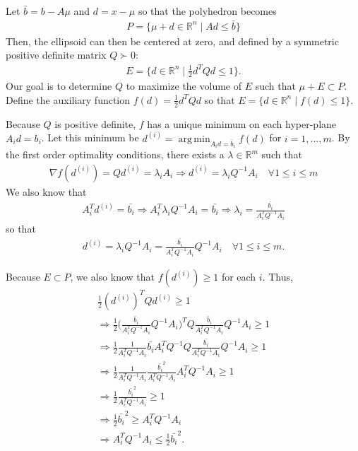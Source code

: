 \documentclass{article}
\theoremstyle{case}
\DeclareMathOperator*{\argmin}{arg\,min}
\newcommand{\Rn}{\mathbb R^n}
\newcommand{\Rm}{\mathbb R^m}
\newcommand{\gradf}{\nabla f}
\begin{document}
Let $\bar{b} = b - A\mu$ and $d = x - \mu$ so that the polyhedron becomes
\begin{align*}
P = \{ \mu + d \in \Rn \; | \;  Ad \le \bar{b} \}
\end{align*}
Then, the ellipsoid can then be centered at zero, and defined by a symmetric positive definite matrix $Q \succ 0$:
\begin{align*}
E = \{ d \in \Rn \; | \; \frac 1 2 d^T Q d \le 1 \}.
\end{align*}
Our goal is to determine $Q$ to maximize the volume of $E$ such that $\mu + E \subset P$.
Define the auxiliary function $f(d) = \frac 1 2 d^T Q d$ so that $E = \{ d \in \Rn\; | \; f(d) \le 1 \}$.

Because $Q$ is positive definite, $f$ has a unique minimum on each hyper-plane $A_i d = b_i$.
Let this minimum be $d^{(i)} = \argmin_{A_id =\bar{b}_i} f(d)$ for $i=1,\ldots,m$.
By the first order optimality conditions, there exists a $\lambda \in \Rm$ such that
\begin{align*}
\gradf(d^{(i)}) = Q d^{(i)} = \lambda_i A_i 
\Longrightarrow d^{(i)} = \lambda_i Q^{-1}A_i \quad \forall 1\le i\le m
\end{align*}
We also know that
\begin{align*}
A_i^T d^{(i)} = \bar{b_i} \Longrightarrow
A_i^T \lambda_i Q^{-1}A_i = \bar{b_i} \Longrightarrow
\lambda_i = \frac {\bar{b_i}}{A_i^T  Q^{-1}A_i}
\end{align*}
so that
\begin{align*}
d^{(i)} = \lambda_i Q^{-1}A_i = \frac {\bar{b_i}}{A_i^T  Q^{-1}A_i}  Q^{-1}A_i \quad \forall 1\le i\le m.
\end{align*}

Because $E \subset P$, we also know that $f(d^{(i)}) \ge 1$ for each $i$. Thus,
\begin{align*}
\frac 1 2 (d^{(i)})^{T} Q d^{(i)} \ge 1 \\
\Longrightarrow \frac 1 2 \bigg(\frac {\bar{b}_i}{A_i^T  Q^{-1}A_i}  Q^{-1}A_i\bigg)^{T} Q \frac {\bar{b}_i}{A_i^T  Q^{-1}A_i}  Q^{-1}A_i \ge 1 \\
\Longrightarrow \frac 1 2 \frac {1}{A_i^T  Q^{-1}A_i}  \bar{b_i} A_i^T Q^{-1} Q \frac {\bar{b_i}}{A_i^T  Q^{-1}A_i}  Q^{-1}A_i \ge 1 \\
\Longrightarrow \frac 1 2 \frac {1}{A_i^T  Q^{-1}A_i}  \frac {\bar{b_i}^2}{A_i^T  Q^{-1}A_i}  A_i^T Q^{-1}A_i \ge 1 \\
\Longrightarrow \frac 1 2  \frac {\bar{b_i}^2}{A_i^T  Q^{-1}A_i} \ge 1 \\
\Longrightarrow \frac 1 2 \bar{b_i}^2\ge A_i^T  Q^{-1}A_i \\
\Longrightarrow A_i^T  Q^{-1}A_i \le \frac 1 2 \bar{b_i}^2.
\end{align*}
\end{document}
